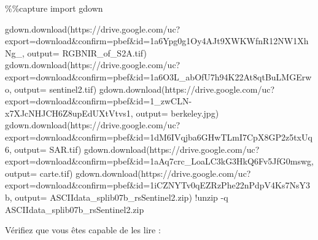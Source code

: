\documentclass[
  11pt,
  letterpaper,
  open=any,
  twoside=false,
  french]{scrbook}
\newenvironment{Shaded}{\begin{snugshade}}{\end{snugshade}}
\newcommand{\BuiltInTok}[1]{\textcolor[rgb]{0.00,0.23,0.31}{#1}}
\newcommand{\ImportTok}[1]{\textcolor[rgb]{0.00,0.46,0.62}{#1}}
\newcommand{\NormalTok}[1]{\textcolor[rgb]{0.00,0.23,0.31}{#1}}
\newcommand{\OperatorTok}[1]{\textcolor[rgb]{0.37,0.37,0.37}{#1}}
\newcommand{\StringTok}[1]{\textcolor[rgb]{0.13,0.47,0.30}{#1}}
\begin{document}
\begin{Shaded}
\begin{Highlighting}[]
\OperatorTok{\%\%}\NormalTok{capture}
\ImportTok{import}\NormalTok{ gdown}

\NormalTok{gdown.download(}\StringTok{\textquotesingle{}https://drive.google.com/uc?export=download\&confirm=pbef\&id=1a6Ypg0g1Oy4AJt9XWKWfnR12NW1XhNg\_\textquotesingle{}}\NormalTok{, output}\OperatorTok{=} \StringTok{\textquotesingle{}RGBNIR\_of\_S2A.tif\textquotesingle{}}\NormalTok{)}
\NormalTok{gdown.download(}\StringTok{\textquotesingle{}https://drive.google.com/uc?export=download\&confirm=pbef\&id=1a6O3L\_abOfU7h94K22At8qtBuLMGErwo\textquotesingle{}}\NormalTok{, output}\OperatorTok{=} \StringTok{\textquotesingle{}sentinel2.tif\textquotesingle{}}\NormalTok{)}
\NormalTok{gdown.download(}\StringTok{\textquotesingle{}https://drive.google.com/uc?export=download\&confirm=pbef\&id=1\_zwCLN{-}x7XJcNHJCH6Z8upEdUXtVtvs1\textquotesingle{}}\NormalTok{, output}\OperatorTok{=} \StringTok{\textquotesingle{}berkeley.jpg\textquotesingle{}}\NormalTok{)}
\NormalTok{gdown.download(}\StringTok{\textquotesingle{}https://drive.google.com/uc?export=download\&confirm=pbef\&id=1dM6IVqjba6GHwTLmI7CpX8GP2z5txUq6\textquotesingle{}}\NormalTok{, output}\OperatorTok{=} \StringTok{\textquotesingle{}SAR.tif\textquotesingle{}}\NormalTok{)}
\NormalTok{gdown.download(}\StringTok{\textquotesingle{}https://drive.google.com/uc?export=download\&confirm=pbef\&id=1aAq7crc\_LoaLC3kG3HkQ6Fv5JfG0mswg\textquotesingle{}}\NormalTok{, output}\OperatorTok{=} \StringTok{\textquotesingle{}carte.tif\textquotesingle{}}\NormalTok{)}
\NormalTok{gdown.download(}\StringTok{\textquotesingle{}https://drive.google.com/uc?export=download\&confirm=pbef\&id=1iCZNYTv0qEZRzPhe22nPdpV4Ks7NsY3b\textquotesingle{}}\NormalTok{, output}\OperatorTok{=} \StringTok{\textquotesingle{}ASCIIdata\_splib07b\_rsSentinel2.zip\textquotesingle{}}\NormalTok{)}
\OperatorTok{!}\NormalTok{unzip }\OperatorTok{{-}}\NormalTok{q ASCIIdata\_splib07b\_rsSentinel2.}\BuiltInTok{zip}
\end{Highlighting}
\end{Shaded}

Vérifiez que vous êtes capable de les lire :
\end{document}
